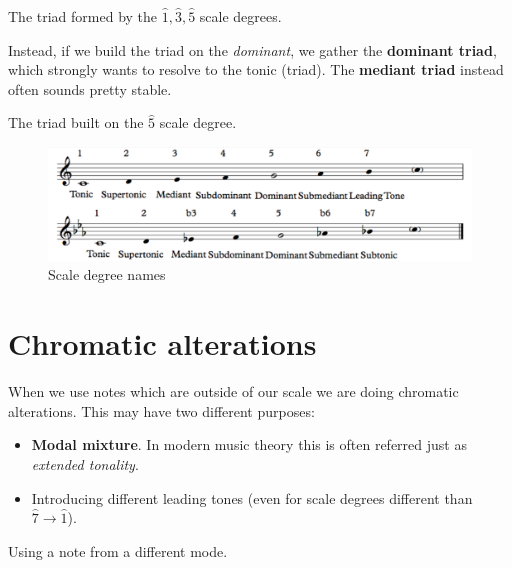 \begin{definition}
    The triad formed by the $\hat 1, \hat 3, \hat 5$ scale degrees.
\end{definition}

Instead, if we build the triad on the \emph{dominant}, we gather the \textbf{dominant triad}, which strongly wants to resolve to the tonic (triad). The \textbf{mediant triad} instead often sounds pretty stable.

\begin{definition}
    The triad built on the $\hat 5$ scale degree.
\end{definition}

\begin{figure}
    \begin{center}
        \includegraphics[width=\textwidth]{img/degrees}
        \caption{Scale degree names}
    \end{center}
\end{figure}

\section{Chromatic alterations}
When we use notes which are outside of our scale we are doing chromatic alterations. This may have two different purposes:
\begin{itemize}
    \item \textbf{Modal mixture}. In modern music theory this is often referred just as \emph{extended tonality}.
    \item Introducing different leading tones (even for scale degrees different than $\hat 7 \to \hat 1$).
\end{itemize}

\begin{definition}
    Using a note from a different mode.
\end{definition}